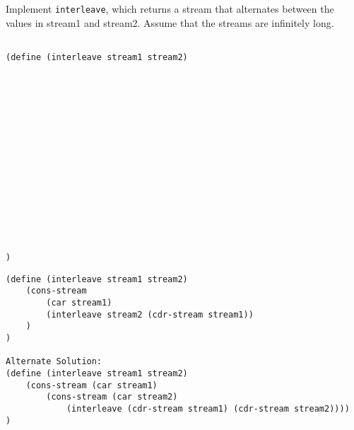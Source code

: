 \begin{blocksection}
\question Implement \lstinline$interleave$, which returns a stream that alternates between the values in stream1 and stream2.
Assume that the streams are infinitely long.

\ifprintanswers\else
\begin{lstlisting}

(define (interleave stream1 stream2)
















)
\end{lstlisting}
\fi

\begin{solution}
\begin{lstlisting}
(define (interleave stream1 stream2)
    (cons-stream
        (car stream1)
        (interleave stream2 (cdr-stream stream1))
    )
)

Alternate Solution:
(define (interleave stream1 stream2)
    (cons-stream (car stream1)
        (cons-stream (car stream2)
            (interleave (cdr-stream stream1) (cdr-stream stream2))))
)
\end{lstlisting}
\end{solution}
\end{blocksection}
